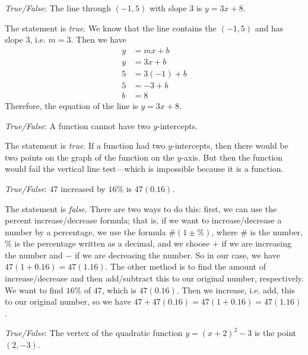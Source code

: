 \documentclass[11pt,letterpaper]{article}
\begin{document}
\quizsol \textit{True/False}: The line through $(-1, 5)$ with slope 3 is $y= 3x + 8$. \pspace

\sol The statement is \textit{true}. We know that the line contains the $(-1, 5)$ and has slope 3, i.e. $m= 3$. Then we have
	\[
	\begin{aligned}
	y&= mx + b \\
	y&= 3x + b \\
	5&= 3(-1) + b \\
	5&= -3 + b \\
	b&= 8 
	\end{aligned}
	\]
Therefore, the equation of the line is $y= 3x + 8$. 



\newpage



\quizsol \textit{True/False}: A function cannot have two $y$-intercepts. \pspace

\sol The statement is \textit{true}. If a function had two $y$-intercepts, then there would be two points on the graph of the function on the $y$-axis. But then the function would fail the vertical line test---which is impossible because it is a function. \pvspace{1.3cm}



\quizsol \textit{True/False}: $47$ increased by $16\%$ is $47(0.16)$. \pspace

\sol The statement is \textit{false}. There are two ways to do this: first, we can use the percent increase/decrease formula; that is, if we want to increase/decrease a number by a percentage, we use the formula $\#(1 \pm \%)$, where $\#$ is the number, $\%$ is the percentage written as a decimal, and we choose $+$ if we are increasing the number and $-$ if we are decreasing the number. So in our case, we have $47(1 + 0.16)= 47(1.16)$. The other method is to find the amount of increase/decrease and then add/subtract this to our original number, respectively. We want to find $16\%$ of $47$, which is $47(0.16)$. Then we increase, i.e. add, this to our original number, so we have $47 + 47(0.16)= 47(1 + 0.16)= 47(1.16)$. \pvspace{1.3cm}



\quizsol \textit{True/False}: The vertex of the quadratic function $y= (x + 2)^2 - 3$ is the point $(2, -3)$. \pspace
\end{document}

